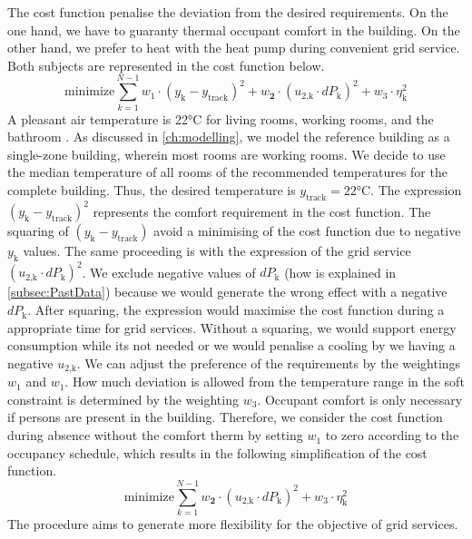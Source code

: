 The cost function penalise the deviation from the desired requirements. On the one hand, we have to guaranty thermal occupant comfort in the building. On the other hand, we prefer to heat with the heat pump during convenient grid service. Both subjects are represented in the cost function below.
    \begin{equation}
        \text{minimize} \sum_{k=1}^{N-1} w_\text{1}\cdot (y_\text{k}-y_\text{track})^2 + w_\textbf{2}\cdot(u_\text{2,k}\cdot dP_\text{k})^2 + w_\text{3} \cdot \eta_\text{k}^2
        \label{eq:costfunctatsächlich}
    \end{equation}
A pleasant air temperature is 22°C for living rooms, working rooms, and the bathroom \cite{Umweltbundesamt.7.10.2021}. As discussed in \autoref{ch:modelling}, we model the reference building as a single-zone building, wherein most rooms are working rooms. We decide to use the median temperature of all rooms of the recommended temperatures for the complete building. Thus, the desired temperature is $y_\text{track} = 22$°C.\newline
The expression $(y_\text{k}-y_\text{track})^2$ represents the comfort requirement in the cost function. The squaring of $(y_\text{k}-y_\text{track})$ avoid a minimising of the cost function due to negative $y_\text{k}$ values. The same proceeding is with the expression of the grid service $(u_\text{2,k}\cdot dP_\text{k})^2$. We exclude negative values of $dP_\text{k}$ (how is explained in \autoref{subsec:PastData}) because we would generate the wrong effect with a negative $dP_\text{k}$. After squaring, the expression would maximise the cost function during a appropriate time for grid services. Without a squaring, we would support energy consumption while its not needed or we would penalise a cooling by we having a negative $u_\text{2,k}$.\newline
We can adjust the preference of the requirements by the weightings $w_\text{1}$ and $w_\text{1}$. How much deviation is allowed from the temperature range in the soft constraint is determined by the weighting $w_\text{3}$.\newline
Occupant comfort is only necessary if persons are present in the building. Therefore, we consider the cost function during absence without the comfort therm by setting $w_\text{1}$ to zero according to the occupancy schedule, which results in the following simplification of the cost function.
    \begin{equation}
        \text{minimize} \sum_{k=1}^{N-1} w_\textbf{2}\cdot(u_\text{2,k}\cdot dP_\text{k})^2 + w_\text{3} \cdot \eta_\text{k}^2
        \label{eq:costfunctionAbwesenheit}
    \end{equation}
The procedure aims to generate more flexibility for the objective of grid services. %


